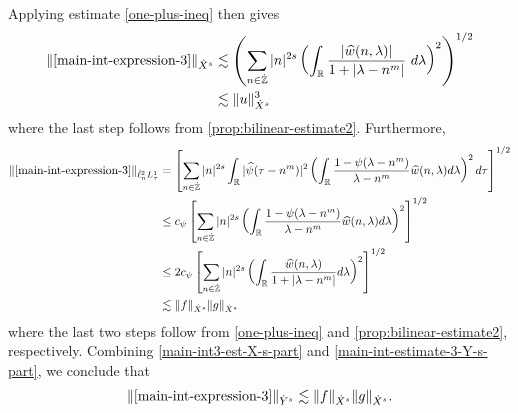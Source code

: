 \documentclass[12pt,reqno]{amsart}
\numberwithin{equation}{section}  %
\numberwithin{figure}{section}
\newcommand{\rr}{\mathbb{R}}
\newcommand{\zz}{\mathbb{Z}}
\newcommand{\zzdot}{\dot{\zz}}
\newcommand{\wh}{\widehat}
\theoremstyle{plain}
\theoremstyle{definition}
\theoremstyle{remark}
\begin{document}
%
%
Applying estimate \eqref{one-plus-ineq} then gives
%
\begin{equation}
	\label{main-int3-est-X-s-part}
	\begin{split}
		\| \eqref{main-int-expression-3} \|_{\dot{X}^s}
		& \lesssim \left( \sum_{n \in \zzdot} |n|^{2s}  \left ( \int_\rr
		\frac{|\wh{w}(n, \lambda)| }{1 + |\lambda - n^{m }|}
		 \ d\lambda \right )^2 \right)^{1/2}
		 \\
		& \lesssim \|u\|_{\dot{X}^s}^3
	\end{split}
\end{equation}
%
where the last step follows from \autoref{prop:bilinear-estimate2}.
Furthermore, 
%
%
\begin{equation}
	\label{main-int-estimate-3-Y-s-part}
	\begin{split}
		\|\eqref{main-int-expression-3}\|_{\dot{\ell}^2_n L^1_\tau}
		& = \left[ \sum_{n \in \zzdot} |n|^{2s} \int_{\rr} |
		\wh{\psi}(\tau - n^{m}) |^{2} \left( \int_{\rr}\frac{1 - \psi(\lambda -
		n^{m})}{\lambda - n^{m}} \wh{w}(n, \lambda) d \lambda \right)^{2} d \tau
		\right]^{1/2}
		\\
		& \le c_{\psi} \left[ \sum_{n \in \zzdot} |n|^{2s} \left(
		\int_{\rr} \frac{1 - \psi(\lambda - n^{m})}{\lambda - n^{m}}
		\wh{w}(n, \lambda) d \lambda
		\right)^{2}\right]^{1/2}
		\\
		& \le 2 c_{\psi} \left[ \sum_{n \in \zzdot} |n|^{2s} \left(
		\int_{\rr} \frac{\wh{w}(n, \lambda) }{1 + |\lambda - n^{m}|}
		d \lambda
		\right)^{2}\right]^{1/2}
		\\
		& \lesssim \|f\|_{\dot{X}^s} \|g\|_{\dot{X}^s} 
	\end{split}
\end{equation}
%
%
where the last two steps follow from \eqref{one-plus-ineq} and
\autoref{prop:bilinear-estimate2}, respectively. Combining
\eqref{main-int3-est-X-s-part} and \eqref{main-int-estimate-3-Y-s-part}, we
conclude that
%
%
\begin{equation}
	\label{main-int3-est}
	\begin{split}
		\|\eqref{main-int-expression-3}\|_{\dot{Y}^s} 
		\lesssim \|f\|_{\dot{X}^s} \|g\|_{\dot{X}^s}.
	\end{split}
\end{equation}
%
%
%
\end{document}
